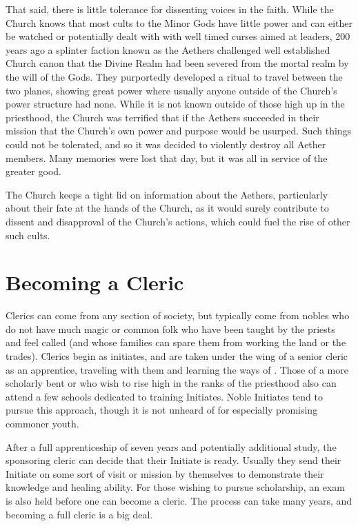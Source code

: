 \documentclass[blue]{GL2020}
\begin{document}
That said, there is little tolerance for dissenting voices in the faith. While the Church knows that most cults to the Minor Gods have little power and can either be watched or potentially dealt with with well timed curses aimed at leaders, 200 years ago a splinter faction known as the Aethers challenged well established Church canon that the Divine Realm had been severed from the mortal realm by the will of the Gods. They purportedly developed a ritual to travel between the two planes, showing great power where usually anyone outside of the Church’s power structure had none. While it is not known outside of those high up in the priesthood, the Church was terrified that if the Aethers succeeded in their mission that the Church’s own power and purpose would be usurped. Such things could not be tolerated, and so it was decided to violently destroy all Aether members. Many memories were lost that day, but it was all in service of the greater good. 

The Church keeps a tight lid on information about the Aethers, particularly about their fate at the hands of the Church, as it would surely contribute to dissent and disapproval of the Church's actions, which could fuel the rise of other such cults.

\section*{Becoming a Cleric}

Clerics can come from any section of society, but typically come from nobles who do not have much magic or common folk who have been taught by the priests and feel called (and whose families can spare them from working the land or the trades). Clerics begin as initiates, and are taken under the wing of a senior cleric as an apprentice, traveling with them and learning the ways of \cFarmGod{}. Those of a more scholarly bent or who wish to rise high in the ranks of the priesthood also can attend a few schools dedicated to training Initiates. Noble Initiates tend to pursue this approach, though it is not unheard of for especially promising commoner youth.  

After a full apprenticeship of seven years and potentially additional study, the sponsoring cleric can decide that their Initiate is ready. Usually they send their Initiate on some sort of visit or mission by themselves to demonstrate their knowledge and healing ability. For those wishing to pursue scholarship, an exam is also held before one can become a cleric. The process can take many years, and becoming a full cleric is a big deal. 
\end{document}
